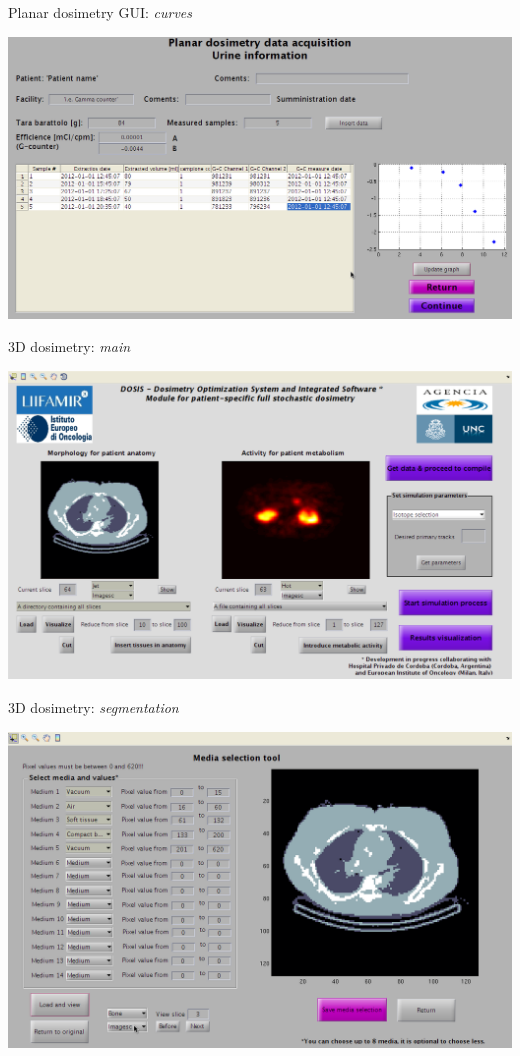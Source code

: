 \documentclass[ignorenonframetext,]{beamer}
\begin{document}
\begin{frame}{Planar dosimetry GUI: \emph{curves}}
\protect\hypertarget{planar-dosimetry-gui-curves}{}

\includegraphics{imgs/planar-curves.png}

\end{frame}

\begin{frame}{3D dosimetry: \emph{main}}
\protect\hypertarget{d-dosimetry-main}{}

\includegraphics{imgs/3d-main.png}

\end{frame}

\begin{frame}{3D dosimetry: \emph{segmentation}}
\protect\hypertarget{d-dosimetry-segmentation}{}

\includegraphics{imgs/3d-segmentation.png}

\end{frame}
\end{document}
